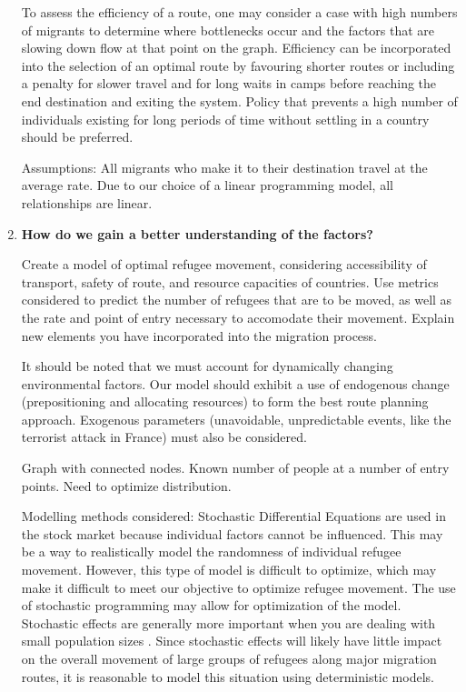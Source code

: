 \documentclass{article}
\begin{document}
\begin{enumerate}
    To assess the efficiency of a route, one may consider a case with high numbers of migrants to determine where bottlenecks occur and the factors that are slowing down flow at that point on the graph. Efficiency can be incorporated into the selection of an optimal route by favouring shorter routes or including a penalty for slower travel and for long waits in camps before reaching the end destination and exiting the system. Policy that prevents a high number of individuals existing for long periods of time without settling in a country should be preferred.

    Assumptions: All migrants who make it to their destination travel at the average rate. Due to our choice of a linear programming model, all relationships are linear. 

    \item {\bf How do we gain a better understanding of the factors?}

    Create a model of optimal refugee movement, considering accessibility of transport, safety of route, and resource capacities of countries. Use metrics considered to predict the number of refugees that are to be moved, as well as the rate and point of entry necessary to accomodate their movement. Explain new elements you have incorporated into the migration process.

    It should be noted that we must account for dynamically changing environmental factors. Our model should exhibit a use of endogenous change (prepositioning and allocating resources) to form the best route planning approach. Exogenous parameters (unavoidable, unpredictable events, like the terrorist attack in France) must also be considered.

    Graph with connected nodes. Known number of people at a number of entry points. Need to optimize distribution.

    Modelling methods considered:
    Stochastic Differential Equations are used in the stock market because individual factors cannot be influenced. This may be a way to realistically model the randomness of individual refugee movement. However, this type of model is difficult to optimize, which may make it difficult to meet our objective to optimize refugee movement. The use of stochastic programming may allow for optimization of the model. Stochastic effects are generally more important when you are dealing with small population sizes \cite{vries}. Since stochastic effects will likely have little impact on the overall movement of large groups of refugees along major migration routes, it is reasonable to model this situation using deterministic models. 


\end{enumerate}
\end{document}
